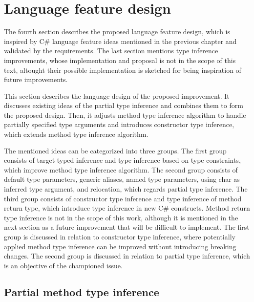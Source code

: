 \chapter{Language feature design}

The fourth section describes the proposed language feature design, which is inspired by C\# language feature ideas mentioned in the previous chapter and validated by the requirements.
The last section mentions type inference improvements, whose implementation and proposal is not in the scope of this text, altought their possible implementation is sketched for being inspiration of future improvements. 

This section describes the language design of the proposed improvement. 
It discusses existing ideas of the partial type inference and combines them to form the proposed design. 
Then, it adjusts method type inference algorithm to handle partially specified type arguments and introduces constructor type inference, which extends method type inference algorithm.
\par
{}
The mentioned ideas can be categorized into three groups. 
The first group consists of target-typed inference and type inference based on type constraints, which improve method type inference algorithm. 
The second group consists of default type parameters, generic aliases, named type parameters, using char as inferred type argument, and relocation, which regards partial type inference. 
The third group consists of constructor type inference and type inference of method return type, which introduce type inference in new C\# constructs. 
Method return type inference is not in the scope of this work, although it is mentioned in the next section as a future improvement that will be difficult to implement. 
The first group is discussed in relation to constructor type inference, where potentially applied method type inference can be improved without introducing breaking changes. 
The second group is discussed in relation to partial type inference, which is an objective of the championed issue.

\section{Partial method type inference}

